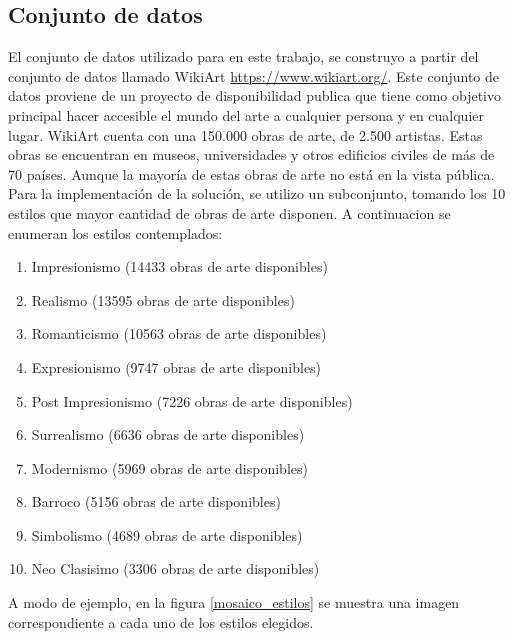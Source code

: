 \documentclass[a4paper,11pt,spanish]{book}
\begin{document}
  \subsection{Conjunto de datos}
    El conjunto de datos utilizado para en este trabajo, se construyo a partir del conjunto de datos llamado WikiArt \url{https://www.wikiart.org/}.
    Este conjunto de datos proviene de un proyecto de disponibilidad publica que tiene como objetivo principal hacer accesible el mundo del arte a cualquier persona y en cualquier lugar.
    WikiArt cuenta con una 150.000 obras de arte, de 2.500 artistas. Estas obras se encuentran en museos, universidades y otros edificios civiles de más de 70 países. Aunque la mayoría de estas obras de arte no está en la vista pública.
    Para la implementación de la solución, se utilizo un subconjunto, tomando los 10 estilos que mayor cantidad de obras de arte disponen. A continuacion se enumeran los estilos contemplados:
    \begin{enumerate}
      \item Impresionismo  (14433 obras de arte disponibles)
      \item Realismo (13595 obras de arte disponibles)
      \item Romanticismo (10563 obras de arte disponibles)
      \item Expresionismo (9747 obras de arte disponibles)
      \item Post Impresionismo (7226 obras de arte disponibles)
      \item Surrealismo (6636 obras de arte disponibles)
      \item Modernismo (5969 obras de arte disponibles)
      \item Barroco (5156 obras de arte disponibles)
      \item Simbolismo (4689 obras de arte disponibles)
      \item Neo Clasisimo (3306 obras de arte disponibles)
    \end{enumerate}
      A modo de ejemplo, en la figura \ref{mosaico_estilos} se muestra una imagen correspondiente a cada uno de los estilos elegidos.
\end{document}
